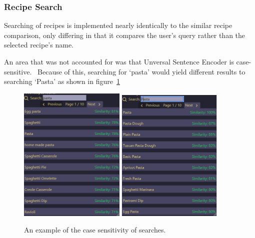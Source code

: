 \subsubsection{Recipe Search}

Searching of recipes is implemented nearly identically to the similar recipe comparison, only differing in that
it compares the user's query rather than the selected recipe's name.

An area that was not accounted for was that Unversal Sentence Encoder is case-sensitive.~
Because of this, searching for \enquote*{pasta} would yield different results to searching \enquote*{Pasta} as
shown in figure~\ref{fig:search_case_sensitive}

\begin{figure}[p]
    \centering
    \caption{\label{fig:search_case_sensitive}An example of the case sensitivity of searches.}
    \includegraphics[width=0.45\textwidth]{figures/search_lower.png}
    \includegraphics[width=0.45\textwidth]{figures/search_upper.png}
\end{figure}

